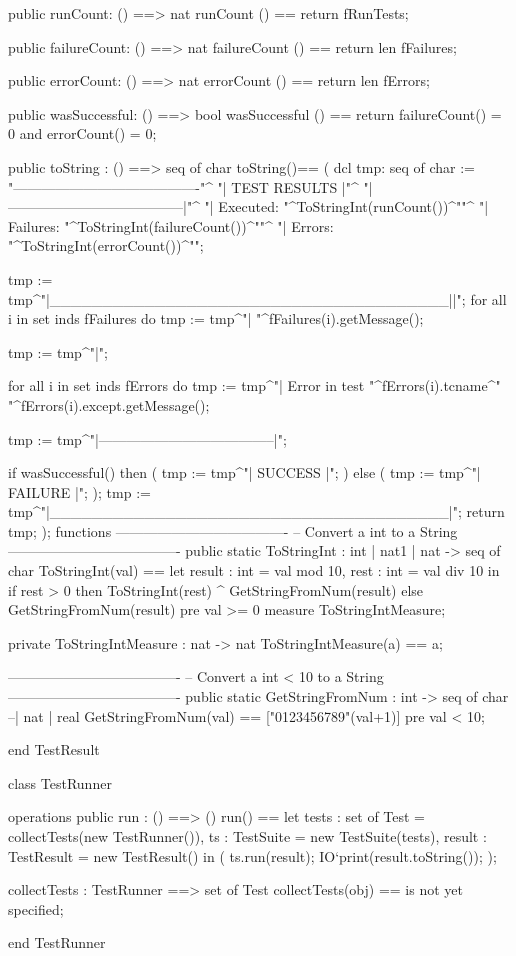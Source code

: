 \documentclass[a4paper]{article}
\begin{document}
\begin{vdm_al}
  public runCount: () ==> nat
  runCount () == return fRunTests;
    
  public failureCount: () ==> nat
  failureCount () == return len fFailures;
  
  public errorCount: () ==> nat
  errorCount () == return len fErrors;
  
  public wasSuccessful: () ==> bool
  wasSuccessful () == return failureCount() = 0 and errorCount() = 0;

  public toString : () ==> seq of char
  toString()==
  (
    dcl tmp: seq of char :=     
        "----------------------------------------\n"^
        "|    TEST RESULTS                      |\n"^
        "|--------------------------------------|\n"^
        "| Executed: "^ToStringInt(runCount())^"\n"^
        "| Failures: "^ToStringInt(failureCount())^"\n"^
        "| Errors:   "^ToStringInt(errorCount())^"\n";
    
    tmp := tmp^"|______________________________________|\n|";
    for all i in set inds fFailures do
        tmp := tmp^"\n| "^fFailures(i).getMessage();
    
    tmp := tmp^"\n|";

    for all i in set inds fErrors do
        tmp := tmp^"\n| Error in test "^fErrors(i).tcname^" "^fErrors(i).except.getMessage();
 
    tmp := tmp^"\n|--------------------------------------|\n";

    if wasSuccessful() 
    then
    (
        tmp := tmp^"|              SUCCESS                 |";
    )
    else
    (
        tmp := tmp^"|              FAILURE                 |";
    );
        tmp := tmp^"\n|______________________________________|";
        return tmp;
  );
functions
-------------------------------------
-- Convert a int to a String
-------------------------------------
public static ToStringInt : int | nat1 | nat -> seq of char
ToStringInt(val) ==
  let result : int = val mod 10,
      rest : int = val div 10
  in if rest > 0 then
       ToStringInt(rest) ^ GetStringFromNum(result)
     else GetStringFromNum(result)
pre val >= 0
measure ToStringIntMeasure;

private ToStringIntMeasure : nat -> nat
ToStringIntMeasure(a) == a;
    
-------------------------------------
-- Convert a int < 10 to a String
-------------------------------------
public static GetStringFromNum : int  -> seq of char --| nat | real
GetStringFromNum(val) == ["0123456789"(val+1)]
pre val < 10;
  
end TestResult  



class TestRunner

operations
public run : () ==> ()
run() ==
      let tests : set of Test = collectTests(new TestRunner()),
          ts : TestSuite = new TestSuite(tests),
          result : TestResult = new TestResult()
      in
      (
          ts.run(result);
          IO`print(result.toString());
      );

collectTests : TestRunner ==> set of Test
collectTests(obj) == is not yet specified;

end TestRunner
\end{vdm_al}
\end{document}
